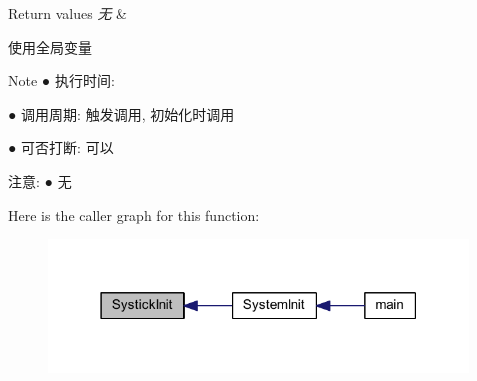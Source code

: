 \begin{DoxyRetVals}{\-Return values}
{\em 无} & \\
\hline
\end{DoxyRetVals}
\begin{DoxyParagraph}{使用全局变量 }

\end{DoxyParagraph}
\begin{DoxyNote}{\-Note}
● 执行时间\-: \par
 ● 调用周期\-: 触发调用, 初始化时调用 \par
 ● 可否打断\-: 可以 \par

\end{DoxyNote}
\begin{DoxyParagraph}{注意\-:}
● 无 \par
 
\end{DoxyParagraph}


\-Here is the caller graph for this function\-:\nopagebreak
\begin{figure}[H]
\begin{center}
\leavevmode
\includegraphics[width=316pt]{group___s_y_s_t_i_c_k_ga6a4dda3916b88b3f9865a6139918cd51_icgraph}
\end{center}
\end{figure}


